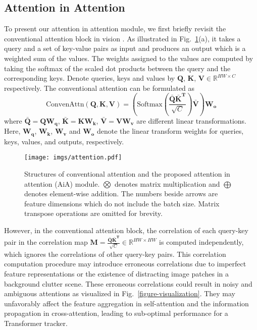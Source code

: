 \subsection{Attention in Attention}
To present our attention in attention module, we first briefly revisit the conventional attention block in vision \cite{dosovitskiy2020image,carion2020end}. As illustrated in Fig.~\ref{figure-attention}(a), it takes a query and a set of key-value pairs as input and produces an output which is a weighted sum of the values. The weights assigned to the values are computed by taking the softmax of the scaled dot products between the query and the corresponding keys. Denote queries, keys and values by $\mathbf{Q}$, $\mathbf{K}$, $\mathbf{V} \in \mathbb{R}^{HW \times C}$ respectively. The conventional attention can be formulated as
\begin{equation}
   \text{ConvenAttn}(\mathbf{Q}, \mathbf{K}, \mathbf{V}) = (\text{Softmax}\left(\frac{\mathbf{\bar{Q}}\mathbf{\bar{K}^{T}}}{\sqrt{C}}\right)\mathbf{\bar{V}})\mathbf{W_{o}}
\end{equation}
where $\mathbf{\bar{Q}} = \mathbf{Q}\mathbf{W_{q}}$, $\mathbf{\bar{K}} = \mathbf{K}\mathbf{W_{k}}$, $\mathbf{\bar{V}} = \mathbf{V}\mathbf{W_{v}}$ are different linear transformations. Here, $\mathbf{W_{q}}$, $\mathbf{W_{k}}$, $\mathbf{W_{v}}$ and $\mathbf{W_{o}}$ denote the linear transform weights for queries, keys, values, and outputs, respectively.

\begin{figure}[t]
\centering
\texttt{[image: imgs/attention.pdf]}
\caption{Structures of conventional attention and the proposed attention in attention (AiA) module. $\bigotimes$ denotes matrix multiplication and $\bigoplus$ denotes element-wise addition. The numbers beside arrows are feature dimensions which do not include the batch size. Matrix transpose operations are omitted for brevity.}
\label{figure-attention}
\end{figure}

However, in the conventional attention block, the correlation of each query-key pair in the correlation map $\mathbf{M} = \frac{\mathbf{\bar{Q}}\mathbf{\bar{K}^{T}}}{\sqrt{C}} \in \mathbb{R}^{HW \times HW}$ is computed independently, which ignores the correlations of other query-key pairs. This correlation computation procedure may introduce erroneous correlations due to imperfect feature representations or the existence of distracting image patches in a background clutter scene. These erroneous correlations could result in noisy and ambiguous attentions as visualized in Fig.~\ref{figure-visualization}. They may unfavorably affect the feature aggregation in self-attention and the information propagation in cross-attention, leading to sub-optimal performance for a Transformer tracker.

